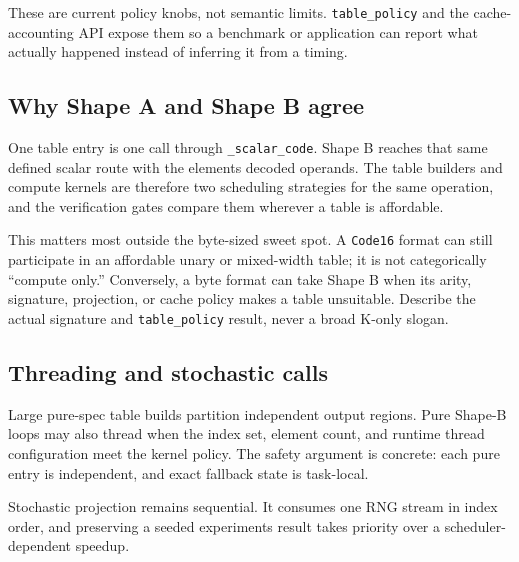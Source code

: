 These are current policy knobs, not semantic limits. \texttt{table\_\allowbreak{}policy} and the cache-accounting API expose them so a benchmark or application can report what actually happened instead of inferring it from a timing.



\subsection{Why Shape A and Shape B agree}



\label{10666765408234111847}{}


One table entry is one call through \texttt{\_\allowbreak{}scalar\_\allowbreak{}code}. Shape B reaches that same defined scalar route with the element{\textquotesingle}s decoded operands. The table builders and compute kernels are therefore two scheduling strategies for the same operation, and the verification gates compare them wherever a table is affordable.



This matters most outside the byte-sized sweet spot. A \texttt{Code16} format can still participate in an affordable unary or mixed-width table; it is not categorically “compute only.” Conversely, a byte format can take Shape B when its arity, signature, projection, or cache policy makes a table unsuitable. Describe the actual signature and \texttt{table\_\allowbreak{}policy} result, never a broad K-only slogan.



\subsection{Threading and stochastic calls}



\label{12311111383536571561}{}


Large pure-spec table builds partition independent output regions. Pure Shape-B loops may also thread when the index set, element count, and runtime thread configuration meet the kernel policy. The safety argument is concrete: each pure entry is independent, and exact fallback state is task-local.



Stochastic projection remains sequential. It consumes one RNG stream in index order, and preserving a seeded experiment{\textquotesingle}s result takes priority over a scheduler-dependent speedup.



